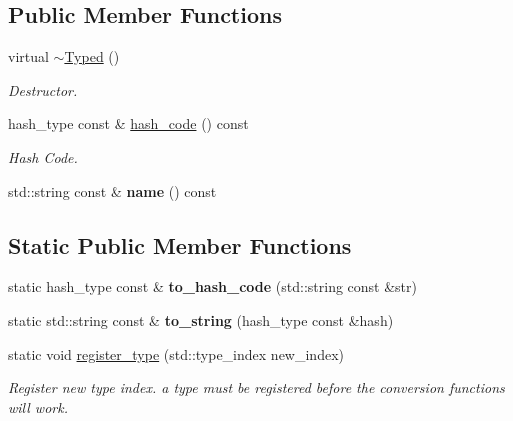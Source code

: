 \subsection*{Public Member Functions}
\begin{DoxyCompactItemize}
\item 
\hypertarget{classNeb_1_1Util_1_1Typed_a26985d3d681e88f022673506bc45b651}{virtual \hyperlink{classNeb_1_1Util_1_1Typed_a26985d3d681e88f022673506bc45b651}{$\sim$\-Typed} ()}\label{classNeb_1_1Util_1_1Typed_a26985d3d681e88f022673506bc45b651}

\begin{DoxyCompactList}\small\item\em Destructor. \end{DoxyCompactList}\item 
\hypertarget{classNeb_1_1Util_1_1Typed_af32707079ebb9e68b2def3d2e334b661}{hash\-\_\-type const \& \hyperlink{classNeb_1_1Util_1_1Typed_af32707079ebb9e68b2def3d2e334b661}{hash\-\_\-code} () const }\label{classNeb_1_1Util_1_1Typed_af32707079ebb9e68b2def3d2e334b661}

\begin{DoxyCompactList}\small\item\em Hash Code. \end{DoxyCompactList}\item 
\hypertarget{classNeb_1_1Util_1_1Typed_ac14568e450df58aa9379966e19edeb87}{std\-::string const \& {\bfseries name} () const }\label{classNeb_1_1Util_1_1Typed_ac14568e450df58aa9379966e19edeb87}

\end{DoxyCompactItemize}
\subsection*{Static Public Member Functions}
\begin{DoxyCompactItemize}
\item 
\hypertarget{classNeb_1_1Util_1_1Typed_accd9a2adb57531c73980b5df3979a307}{static hash\-\_\-type const \& {\bfseries to\-\_\-hash\-\_\-code} (std\-::string const \&str)}\label{classNeb_1_1Util_1_1Typed_accd9a2adb57531c73980b5df3979a307}

\item 
\hypertarget{classNeb_1_1Util_1_1Typed_a1f51abe63e6f90bc940eb3af50844b50}{static std\-::string const \& {\bfseries to\-\_\-string} (hash\-\_\-type const \&hash)}\label{classNeb_1_1Util_1_1Typed_a1f51abe63e6f90bc940eb3af50844b50}

\item 
\hypertarget{classNeb_1_1Util_1_1Typed_a7dde8c08a7b5333f77b4c37fec991047}{static void \hyperlink{classNeb_1_1Util_1_1Typed_a7dde8c08a7b5333f77b4c37fec991047}{register\-\_\-type} (std\-::type\-\_\-index new\-\_\-index)}\label{classNeb_1_1Util_1_1Typed_a7dde8c08a7b5333f77b4c37fec991047}

\begin{DoxyCompactList}\small\item\em Register new type index. a type must be registered before the conversion functions will work. \end{DoxyCompactList}\end{DoxyCompactItemize}
